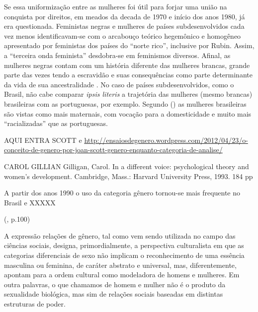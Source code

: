 Se essa uniformização entre as mulheres foi útil para forjar uma união na conquista por direitos, em meados da decada de 1970 e início dos anos 1980, já era questionada. Feministas negras e mulheres de países subdesenvolvidos \cite{FURTADO2009} cada vez menos identificavam-se com o arcabouço teórico hegemônico e homogêneo apresentado por feministas dos países do ``norte rico'', inclusive por Rubin. Assim, a ``terceira onda feminista'' desdobra-se em feminismos diversos. Afinal, as mulheres negras contam com um história diferente das mulheres brancas, grande parte das vezes tendo a escravidão e suas consequências como parte determinante da vida de sua ancestralidade \cite{HOOKS1990}. No caso de países subdesenvolvidos, como o Brasil, não cabe comparar \emph{ipsis literis} a trajetória das mulheres (mesmo brancas) brasileiras com as portuguesas, por exemplo. Segundo (\citeyear{PINTO2004}) as mulheres brasileiras são vistas como mais maternais, com vocação para a domesticidade e muito mais ``racializadas'' que as portuguesas.


AQUI ENTRA SCOTT e 
\url{http://ensaiosdegenero.wordpress.com/2012/04/23/o-conceito-de-genero-por-joan-scott-genero-enquanto-categoria-de-analise/}

CAROL GILLIAN
Gilligan, Carol. In a different voice: psychological theory and women's development. Cambridge, Mass.: Harvard University Press, 1993. 184 pp

A partir dos anos 1990 o uso da categoria gênero tornou-se mais frequente no Brasil \cite{MORAES1998} e XXXXX

(\citeyear{MORAES1998}, p.100)
\begin{citacao}
A expressão relações de gênero, tal como vem sendo utilizada no campo das ciências sociais, designa, primordialmente, a perspectiva culturalista em que as categorias diferenciais de sexo não implicam o reconhecimento de uma essência masculina ou feminina, de caráter abstrato e universal, mas, diferentemente, apontam para a ordem cultural como modeladora de homens e mulheres. Em outra palavras, o que chamamos de homem e mulher não é o produto da sexualidade biológica, mas sim de relações sociais baseadas em distintas estruturas de poder.
\end{citacao}


